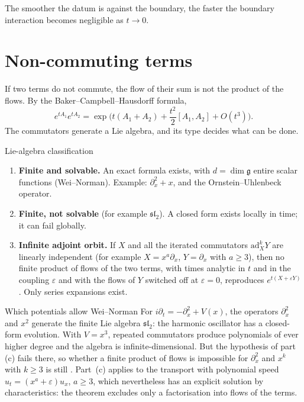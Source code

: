 The smoother the datum is against the boundary, the faster the boundary interaction becomes negligible as $t\to0$.

\section{Non-commuting terms}\label{sec:noncomm}

If two terms do not commute, the flow of their sum is not the product of the flows. By the Baker--Campbell--Hausdorff formula,
\[
e^{tA_1}e^{tA_2}=\exp\Big(t(A_1+A_2)+\frac{t^2}{2}[A_1,A_2]+O(t^3)\Big).
\]
The commutators generate a Lie algebra, and its type decides what can be done.

\begin{theorem}{Lie-algebra classification  \proved}\label{thm:lie}
\begin{enumerate}[label=(\alph*)]
\item \textbf{Finite and solvable.} An exact formula exists, with $d=\dim\mathfrak g$ entire scalar functions (Wei--Norman). Example: $\partial_x^2+x$, and the Ornstein--Uhlenbeck operator.
\item \textbf{Finite, not solvable} (for example $\mathfrak{sl}_2$). A closed form exists locally in time; it can fail globally.
\item \textbf{Infinite adjoint orbit.} If $X$ and all the iterated commutators $\mathrm{ad}_X^kY$ are linearly independent (for example $X=x^a\partial_x$, $Y=\partial_x$ with $a\ge3$), then no finite product of flows of the two terms, with times analytic in $t$ and in the coupling $\varepsilon$ and with the flows of $Y$ switched off at $\varepsilon=0$, reproduces $e^{t(X+\varepsilon Y)}$. Only series expansions exist.
\end{enumerate}
\end{theorem}

\begin{example}{Which potentials allow Wei--Norman}
For $i\partial_t=-\partial_x^2+V(x)$, the operators $\partial_x^2$ and $x^2$ generate the finite Lie algebra $\mathfrak{sl}_2$: the harmonic oscillator has a closed-form evolution. With $V=x^3$, repeated commutators produce polynomials of ever higher degree and the algebra is infinite-dimensional. But the hypothesis of part (c) fails there, so whether a finite product of flows is impossible for $\partial_x^2$ and $x^k$ with $k\ge3$ is still \openq{} . Part~(c) applies to the transport with polynomial speed $u_t=(x^a+\varepsilon)u_x$, $a\ge3$, which nevertheless has an explicit solution by characteristics: the theorem excludes only a factorisation into flows of the terms.
\end{example}

